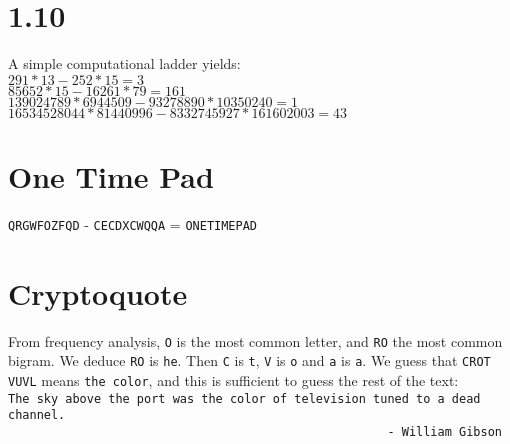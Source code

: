 \documentclass{article}
\begin{document}
\section*{1.10}
A simple computational ladder yields:\\
$291*13-252*15 = 3$\\
$85652*15-16261*79 = 161$\\
$139024789*6944509-93278890*10350240 = 1$\\
$16534528044*81440996-8332745927*161602003 = 43$

\section*{One Time Pad}
\verb|QRGWFOZFQD| - \verb|CECDXCWQQA| = \verb|ONETIMEPAD|

\section*{Cryptoquote}
From frequency analysis, \verb|O| is the most common letter, and \verb|RO| the most common bigram. We deduce \verb|RO| is \verb|he|. Then \verb|C| is \verb|t|, \verb|V| is \verb|o| and \verb|a| is \verb|a|. We guess that \verb|CROT VUVL| means \verb|the color|, and this is sufficient to guess the rest of the text:\\
\verb|The sky above the port was the color of television tuned to a dead channel.|\\
\verb|                                                     - William Gibson|
\end{document}
